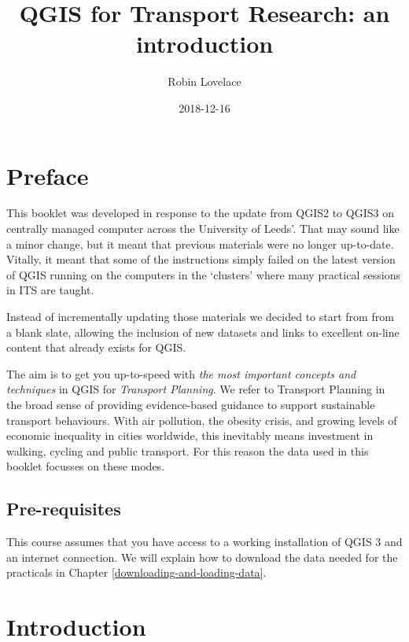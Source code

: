 \documentclass[10pt,a5paper,]{book}
\title{QGIS for Transport Research: an introduction}
\author{Robin Lovelace}
\date{2018-12-16}
\begin{document}
\maketitle

{
\setcounter{tocdepth}{2}
\tableofcontents
}
\hypertarget{preface}{%
\chapter*{Preface}\label{preface}}


This booklet was developed in response to the update from QGIS2 to QGIS3 on centrally managed computer across the University of Leeds'.
That may sound like a minor change, but it meant that previous materials were no longer up-to-date.
Vitally, it meant that some of the instructions simply failed on the latest version of QGIS running on the computers in the `clusters' where many practical sessions in ITS are taught.

Instead of incrementally updating those materials we decided to start from from a blank slate, allowing the inclusion of new datasets and links to excellent on-line content that already exists for QGIS.

The aim is to get you up-to-speed with \emph{the most important concepts and techniques} in QGIS for \emph{Transport Planning}.
We refer to Transport Planning in the broad sense of providing evidence-based guidance to support sustainable transport behaviours.
With air pollution, the obesity crisis, and growing levels of economic inequality in cities worldwide, this inevitably means investment in walking, cycling and public transport.
For this reason the data used in this booklet focusses on these modes.

\hypertarget{pre-requisites}{%
\section*{Pre-requisites}\label{pre-requisites}}


This course assumes that you have access to a working installation of QGIS 3 and an internet connection.
We will explain how to download the data needed for the practicals in Chapter \ref{downloading-and-loading-data}.

\mainmatter

\hypertarget{introduction}{%
\chapter{Introduction}\label{introduction}}
\end{document}
